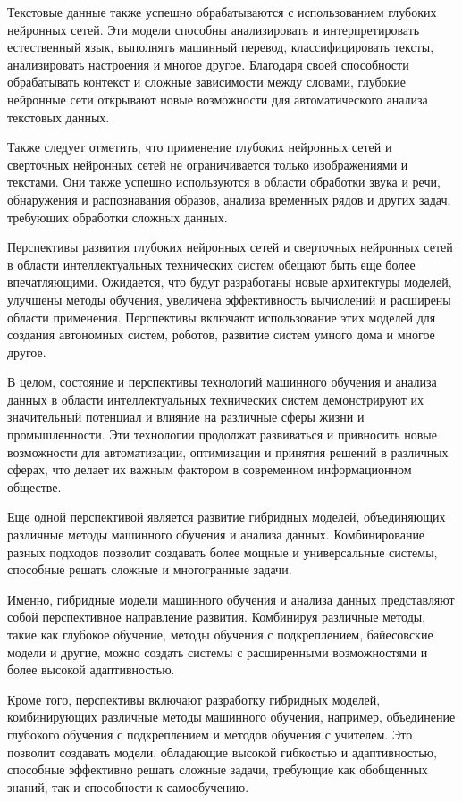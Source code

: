     Текстовые данные также успешно обрабатываются с использованием глубоких нейронных сетей. Эти модели способны анализировать и интерпретировать естественный язык, выполнять машинный перевод, классифицировать тексты, анализировать настроения и многое другое. Благодаря своей способности обрабатывать контекст и сложные зависимости между словами, глубокие нейронные сети открывают новые возможности для автоматического анализа текстовых данных.
    
    Также следует отметить, что применение глубоких нейронных сетей и сверточных нейронных сетей не ограничивается только изображениями и текстами. Они также успешно используются в области обработки звука и речи, обнаружения и распознавания образов, анализа временных рядов и других задач, требующих обработки сложных данных.
    
    Перспективы развития глубоких нейронных сетей и сверточных нейронных сетей в области интеллектуальных технических систем обещают быть еще более впечатляющими. Ожидается, что будут разработаны новые архитектуры моделей, улучшены методы обучения, увеличена эффективность вычислений и расширены области применения. Перспективы включают использование этих моделей для создания автономных систем, роботов, развитие систем умного дома и многое другое.
    
    В целом, состояние и перспективы технологий машинного обучения и анализа данных в области интеллектуальных технических систем демонстрируют их значительный потенциал и влияние на различные сферы жизни и промышленности. Эти технологии продолжат развиваться и привносить новые возможности для автоматизации, оптимизации и принятия решений в различных сферах, что делает их важным фактором в современном информационном обществе.
    
    Еще одной перспективой является развитие гибридных моделей, объединяющих различные методы машинного обучения и анализа данных. Комбинирование разных подходов позволит создавать более мощные и универсальные системы, способные решать сложные и многогранные задачи.
    
    Именно, гибридные модели машинного обучения и анализа данных представляют собой перспективное направление развития. Комбинируя различные методы, такие как глубокое обучение, методы обучения с подкреплением, байесовские модели и другие, можно создать системы с расширенными возможностями и более высокой адаптивностью.
    
    Кроме того, перспективы включают разработку гибридных моделей, комбинирующих различные методы машинного обучения, например, объединение глубокого обучения с подкреплением и методов обучения с учителем. Это позволит создавать модели, обладающие высокой гибкостью и адаптивностью, способные эффективно решать сложные задачи, требующие как обобщенных знаний, так и способности к самообучению.
    
